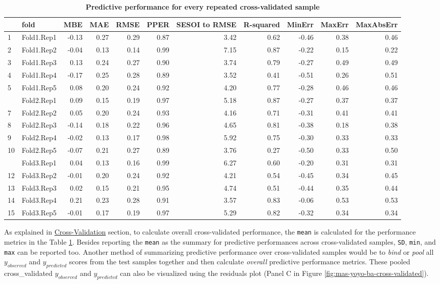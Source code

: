\documentclass[
]{book}
\begin{document}
\begin{table}

\caption{\label{tab:mas-yoyo-cv-performance}\textbf{Predictive performance for every repeated cross-validated sample}}
\centering
\begin{tabular}[t]{llrrrrrrrrr}
\toprule
  & fold & MBE & MAE & RMSE & PPER & SESOI to RMSE & R-squared & MinErr & MaxErr & MaxAbsErr\\
\midrule
1 & Fold1.Rep1 & -0.13 & 0.27 & 0.29 & 0.87 & 3.42 & 0.62 & -0.46 & 0.38 & 0.46\\
2 & Fold1.Rep2 & -0.04 & 0.13 & 0.14 & 0.99 & 7.15 & 0.87 & -0.22 & 0.15 & 0.22\\
3 & Fold1.Rep3 & 0.13 & 0.24 & 0.27 & 0.90 & 3.74 & 0.79 & -0.27 & 0.49 & 0.49\\
4 & Fold1.Rep4 & -0.17 & 0.25 & 0.28 & 0.89 & 3.52 & 0.41 & -0.51 & 0.26 & 0.51\\
5 & Fold1.Rep5 & 0.08 & 0.20 & 0.24 & 0.92 & 4.20 & 0.77 & -0.28 & 0.46 & 0.46\\
\addlinespace
6 & Fold2.Rep1 & 0.09 & 0.15 & 0.19 & 0.97 & 5.18 & 0.87 & -0.27 & 0.37 & 0.37\\
7 & Fold2.Rep2 & 0.05 & 0.20 & 0.24 & 0.93 & 4.16 & 0.71 & -0.31 & 0.41 & 0.41\\
8 & Fold2.Rep3 & -0.14 & 0.18 & 0.22 & 0.96 & 4.65 & 0.81 & -0.38 & 0.18 & 0.38\\
9 & Fold2.Rep4 & -0.02 & 0.13 & 0.17 & 0.98 & 5.92 & 0.75 & -0.30 & 0.33 & 0.33\\
10 & Fold2.Rep5 & -0.07 & 0.21 & 0.27 & 0.89 & 3.76 & 0.27 & -0.50 & 0.33 & 0.50\\
\addlinespace
11 & Fold3.Rep1 & 0.04 & 0.13 & 0.16 & 0.99 & 6.27 & 0.60 & -0.20 & 0.31 & 0.31\\
12 & Fold3.Rep2 & -0.01 & 0.20 & 0.24 & 0.92 & 4.21 & 0.54 & -0.45 & 0.34 & 0.45\\
13 & Fold3.Rep3 & 0.02 & 0.15 & 0.21 & 0.95 & 4.74 & 0.51 & -0.44 & 0.35 & 0.44\\
14 & Fold3.Rep4 & 0.21 & 0.23 & 0.28 & 0.91 & 3.57 & 0.83 & -0.06 & 0.53 & 0.53\\
15 & Fold3.Rep5 & -0.01 & 0.17 & 0.19 & 0.97 & 5.29 & 0.82 & -0.32 & 0.34 & 0.34\\
\bottomrule
\end{tabular}
\end{table}

As explained in \protect\hyperlink{cross-validation}{Cross-Validation} section, to calculate overall cross-validated performance, the \texttt{mean} is calculated for the performance metrics in the Table \ref{tab:mas-yoyo-cv-performance}. Besides reporting the \texttt{mean} as the summary for predictive performances across cross-validated samples, \texttt{SD}, \texttt{min}, and \texttt{max} can be reported too. Another method of summarizing predictive performance over cross-validated samples would be to \emph{bind} or \emph{pool} all \(y_{observed}\) and \(y_{predicted}\) scores from the test samples together and then calculate \emph{overall} predictive performance metrics. These pooled cross\_validated \(y_{observed}\) and \(y_{predicted}\) can also be visualized using the residuals plot (Panel C in Figure \ref{fig:mas-yoyo-ba-cross-validated}).
\end{document}
